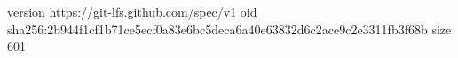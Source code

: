 version https://git-lfs.github.com/spec/v1
oid sha256:2b944f1cf1b71ce5ecf0a83e6bc5deca6a40e63832d6c2ace9c2e3311fb3f68b
size 601
